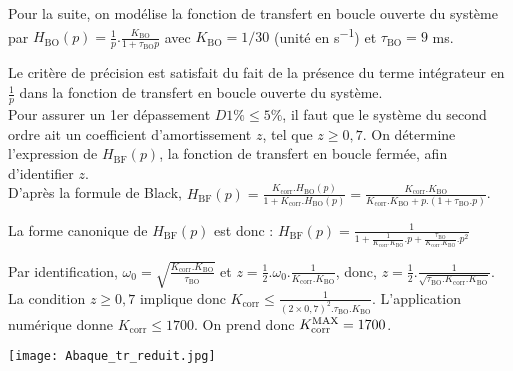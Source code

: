 \ifprof
\else
Pour la suite, on modélise la fonction de transfert en boucle ouverte du système par \linebreak $H_{\text{BO}}(p) = \frac{1}{p}.\frac{K_{\text{BO}}}{1+\tau_{\text{BO}}p}$ avec $K_{\text{BO}} = 1/30$ (unité en \si{s^{-1}}) et $\tau_{\text{BO}} = 9$ ms.
\fi


\ifprof
\begin{corrige}
Le critère de précision est satisfait du fait de la présence du terme intégrateur en $\frac{1}{p}$ dans la fonction de transfert en boucle ouverte du système.\\
Pour assurer un 1er dépassement $D1\% \leq 5 \%$, il faut que le système du second ordre ait un coefficient d'amortissement $z$, tel que $z \ge 0,7$. On détermine l'expression de $H_{\text{BF}}(p)$, la fonction de transfert en boucle fermée, afin d'identifier $z$.\\
D'après la formule de Black, $H_{\text{BF}}(p) = \frac{K_{\text{corr}}.H_{\text{BO}}(p)}{1+K_{\text{corr}}.H_{\text{BO}}(p)} = \frac{K_{\text{corr}}.K_{\text{BO}}}{K_{\text{corr}}.K_{\text{BO}} + p.\left( 1+ \tau_{\text{BO}}.p \right)}$.

La forme canonique de $H_{\text{BF}}(p)$ est donc :
$H_{\text{BF}}(p) = \frac{1}{1+\frac{1}{K_{\text{corr}}.K_{\text{BO}}}.p+ \frac{\tau_{\text{BO}}}{K_{\text{corr}}.K_{\text{BO}}}.p^2} $

Par identification,
$\omega_0 = \sqrt{\frac{K_{\text{corr}}.K_{\text{BO}}}{\tau_{\text{BO}}}} $ et $z=\frac{1}{2}.\omega_0.\frac{1}{K_{\text{corr}}.K_{\text{BO}}}$,
donc, $z = \frac{1}{2}.\frac{1}{\sqrt{\tau_{\text{BO}}.K_{\text{corr}}.K_{\text{BO}}}}$.
La condition $z \ge 0,7$ implique donc $K_{\text{corr}} \leq \frac{1}{(2 \times 0,7)^2.\tau_{\text{BO}}.K_{\text{BO}}}$.
L'application numérique donne $K_{\text{corr}} \leq 1700$. On prend donc $K_{\text{corr}}^{\text{\text{MAX}}} = 1700$.
\end{corrige}
\fi



\ifprof
\else
\begin{marginfigure}
\texttt{[image: Abaque\_tr\_reduit.jpg]}
\end{marginfigure}
\fi

